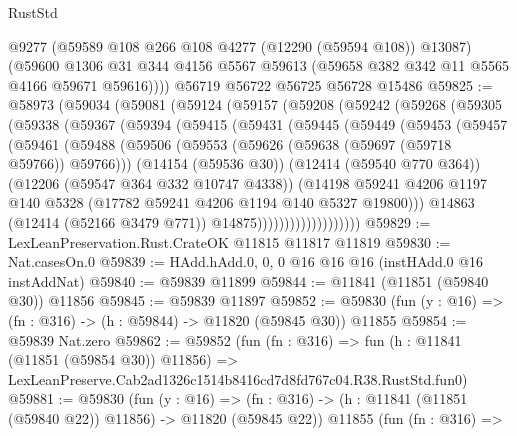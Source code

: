 \begin{lexlean}{RustStd}
\begin{coremodule}
        @9277
        (@59589 @108 @266 @108 @4277 (@12290 (@59594 @108)) @13087)
        (@59600
          @1306
          @31
          @344
          @4156
          @5567
          @59613
          (@59658 @382 @342 @11 @5565 @4166 @59671 @59616))))
    @56719
    @56722
    @56725
    @56728
    @15486
@59825 := @58973
    (@59034
      (@59081
        (@59124
          (@59157
            (@59208
              (@59242
                (@59268
                  (@59305
                    (@59338
                      (@59367
                        (@59394
                          (@59415
                            (@59431
                              (@59445
                                (@59449
                                  (@59453
                                    (@59457
                                      (@59461
                                        (@59488
                                          (@59506
                                            (@59553
                                              (@59626 (@59638 (@59697 (@59718 @59766)) @59766)))
                                            (@14154 (@59536 @30))
                                            (@12414 (@59540 @770 @364))
                                            (@12206 (@59547 @364 @332 @10747 @4338))
                                            (@14198
                                              @59241
                                              @4206
                                              @1197
                                              @140
                                              @5328
                                              (@17782 @59241 @4206 @1194 @140 @5327 @19800)))
                                          @14863
                                          (@12414 (@52166 @3479 @771))
                                          @14875)))))))))))))))))))
@59829 := LexLeanPreservation.Rust.CrateOK @11815 @11817 @11819
@59830 := Nat.casesOn.{0}
@59839 := HAdd.hAdd.{0, 0, 0} @16 @16 @16 (instHAdd.{0} @16 instAddNat)
@59840 := @59839 @11899
@59844 := @11841 (@11851 (@59840 @30)) @11856
@59845 := @59839 @11897
@59852 := @59830 (fun (y : @16) => (fn : @316) -> (h : @59844) -> @11820 (@59845 @30)) @11855
@59854 := @59839 Nat.zero
@59862 := @59852
    (fun (fn : @316) =>
    fun (h : @11841 (@11851 (@59854 @30)) @11856) =>
    LexLeanPreserve.Cab2ad1326c1514b8416cd7d8fd767c04.R38.RustStd.fun0)
@59881 := @59830
    (fun (y : @16) =>
    (fn : @316) -> (h : @11841 (@11851 (@59840 @22)) @11856) -> @11820 (@59845 @22))
    @11855
    (fun (fn : @316) =>

\end{coremodule}
\end{lexlean}

